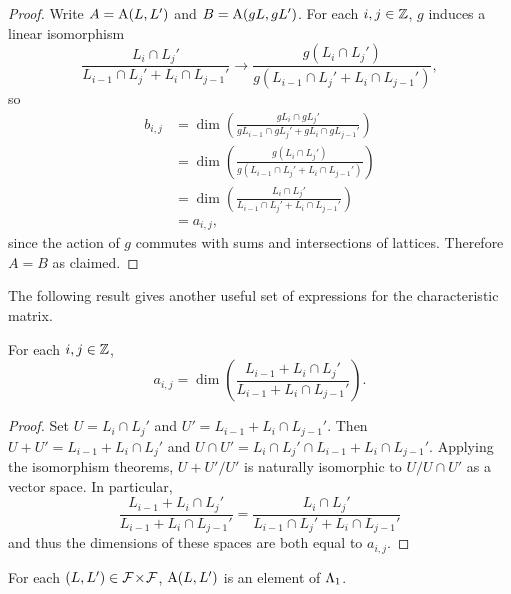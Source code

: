 \documentclass[a4paper, 11pt, twoside]{report}
\begin{document}
\begin{proof}
Write $A=\operatorname{A}(L,L')$ and $B=\operatorname{A}(gL,gL')$. For each $i,j\in\mathbb{Z}$, $g$ induces a linear isomorphism
\begin{equation*}
\frac{L_i\cap L_j'}{L_{i-1}\cap L_j' + L_i\cap L_{j-1}'} \to \frac{g(L_i\cap L_j')}{g(L_{i-1}\cap L_j' + L_i\cap L_{j-1}')},
\end{equation*}
so
\begin{align*}
b_{i,j}
&= \dim\left(\frac{gL_i\cap gL_j'}{gL_{i-1}\cap gL_j' + gL_i\cap gL_{j-1}'}\right)\\
&= \dim\left(\frac{g(L_i\cap L_j')}{g(L_{i-1}\cap L_j' + L_i\cap L_{j-1}')}\right)\\
&= \dim\left(\frac{L_i\cap L_j'}{L_{i-1}\cap L_j' + L_i\cap L_{j-1}'}\right)\\
&= a_{i,j},
\end{align*}
since the action of $g$ commutes with sums and intersections of lattices. Therefore $A=B$ as claimed.
\end{proof}

The following result gives another useful set of expressions for the characteristic matrix.

\begin{lemma}\label{lemma:characteristic-matrix-alternative}
For each $i,j\in\mathbb{Z}$,
\begin{equation*}
a_{i,j} = \dim\left(\frac{L_{i-1} + L_i\cap L_j'}{L_{i-1} + L_i\cap L_{j-1}'}\right).
\end{equation*}
\end{lemma}

\begin{proof}
Set $U=L_i\cap L_j'$ and $U'=L_{i-1}+L_i\cap L_{j-1}'$. Then $U+U'=L_{i-1}+L_i\cap L_j'$ and $U\cap U'= L_i\cap L_j'\cap L_{i-1} + L_i\cap L_{j-1}'$. Applying the isomorphism theorems, ${U+U'}/{U'}$ is naturally isomorphic to $U/{U\cap U'}$ as a vector space. In particular,
\begin{equation*}
\frac{L_{i-1}+L_i\cap L_j'}{L_{i-1} + L_i\cap L_{j-1}'} = \frac{L_i\cap L_j'}{L_{i-1}\cap L_j' + L_i\cap L_{j-1}'}
\end{equation*}
and thus the dimensions of these spaces are both equal to $a_{i,j}$.
\end{proof}

\begin{lemma}
For each $(L,L')\in{\mathcal{F}\!\times\!\mathcal{F}}$, $\operatorname{A}(L,L')$ is an element of $\Lambda_1{}$.
\end{lemma}
\end{document}
